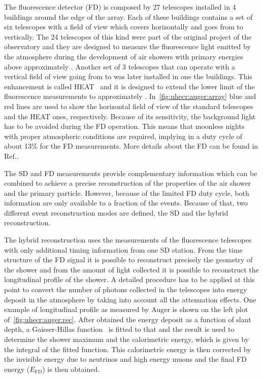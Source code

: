 The fluorescence detector (FD) is composed by 27 telescopes installed in
4 buildings around the edge of the array. Each of these buildings contains
a set of six telescopes with a field of view which covers  horizontally
and goes from  to  vertically. The 24 telescopes of this kind
were part of the original project of the observatory and they are designed to measure
the fluorescence light emitted by the atmosphere during the development of air showers
with primary energies above approximately . Another set of 3 telescopes
that can operate with a vertical field of view going from  to 
was later installed in one the buildings.
This enhancement is called HEAT~\cite{Mathes:2011zz} and it is
designed to extend the lower limit of the fluorescence measurements to approximately .
In~\cref{fig:uhecr:auger:array}
blue and red lines are used to show the horizontal field of view of the standard telescopes
and the HEAT ones, respectively. Because of its sensitivity, the background light has to be avoided
during the FD operation. This means that moonless nights with proper atmospheric conditions
are required, implying in a duty cycle of about 13\% for the FD measurements. 
More details about the FD can be found in Ref.\cite{Abraham:2009pm}.

The SD and FD measurements provide complementary information 
which can be combined to achieve a precise reconstruction of the
properties of the air shower and the primary particle.
However, because of the limited FD duty cycle, both information
are only available to a fraction of the events. Because of that,
two different event reconstruction modes are defined, the SD and
the hybrid reconstruction.

The hybrid reconstruction uses the measurements of the
fluorescence telescopes with only additional timing information
from one SD station. From the time structure of the FD signal it is
possible to reconstruct precisely the geometry of the shower and
from the amount of light collected it is possible to reconstruct the
longitudinal profile of the shower. A detailed procedure has to be applied
at this point to convert the number of photons collected in the telescopes
into energy deposit in the atmosphere by
taking into account all the attenuation effects.
One example of longitudinal profile as measured by Auger is shown
on the left plot of~\cref{fig:uhecr:auger:rec}.
After obtained the energy deposit as a function of slant depth,
a Gaisser-Hillas function~\cite{GaisserHillas1977} is fitted to that and the result
is used to determine the shower maximum \xmax and the calorimetric energy,
which is given by the integral of the fitted function. This calorimetric
energy is then corrected by the invisible energy due to neutrinos and high energy
muons and the final FD energy ($E_\text{FD}$) is then obtained.

